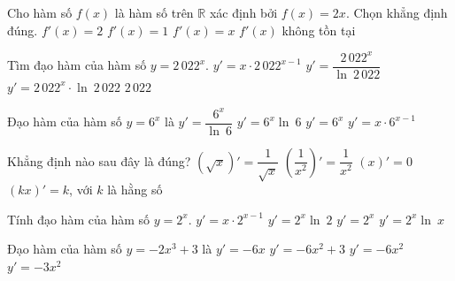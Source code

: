 

\begin{ex}%
	Cho hàm số $f(x)$ là hàm số trên  $\mathbb{R}$ xác định bởi $f(x)=2x$. Chọn khẳng định đúng.
	 \choice
		{\True  $f'(x)=2$}
		 {$f'(x)=1$}
		 {$f'(x)=x$}
		{$f'(x)$ không  tồn tại}
\end{ex}

\begin{ex}%
	Tìm đạo hàm của hàm số  $y=2\, 022^{x}$.
	 \choice
		{$y'=x \cdot  2\, 022^{x-1}$}
		{$y'=\dfrac{2\,  022^{x}}{\ln~2\, 022}$}
		{\True $y'=2\, 022^{x} \cdot \ln~2\,  022$}
		{$2\,  022$}
\end{ex}

\begin{ex}%
	Đạo  hàm của hàm số $y=6^{x}$ là
	\choice 
		{$y'=\dfrac{6^{x}}{\ln~6}$} 
		{\True  $y'=6^{x}\ln~6$}
		 {$y'=6^{x}$}
		{$y'=x \cdot  6^{x-1}$}
\end{ex}

\begin{ex}%
	Khẳng định  nào sau đây là đúng?
	 \choice
		 {$\left(\sqrt{x}\right)'=\dfrac{1}{\sqrt{x}}$}
		 {$\left(\dfrac{1}{x^2}\right)'=\dfrac{1}{x^2}$}
		{$(x)'=0$} 
		{\True $(kx)'=k$, với $k$ là  hằng số}
\end{ex}

\begin{ex}%
	Tính đạo hàm của hàm  số $y=2^{x}$.
	 \choice
		{$y'=x  \cdot 2^{x-1}$}
		 {\True $y'=2^{x}\ln~2$}
		 {$y'=2^{x}$}
		 {$y'=2^{x}\ln~x$}
\end{ex}

\begin{ex}%
	Đạo hàm của hàm số $y=-2x^3+3$  là
	\choice 
		 {$y'=-6x$}
		 {$y'=-6x^2+3$}
		{\True $y'=-6x^2$} 
		 {$y'=-3x^2$}
\end{ex}

